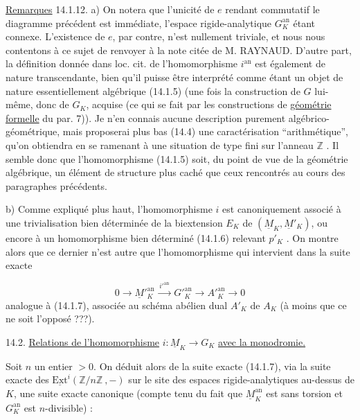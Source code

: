 
\underline{Remarques} 14.1.12. a) On notera que l'unicité de $e$ rendant commutatif le diagramme précédent est immédiate, l'espace rigide-analytique $G_K^{\mathrm{an}}$ étant connexe. L'existence de $e$, par contre, n'est nullement triviale, et nous nous contentons à ce sujet de renvoyer à la note citée de M. RAYNAUD. D'autre part, la définition donnée dans loc. cit. de l'homomorphisme $i^{\mathrm{an}}$ est également de nature transcendante, bien qu'il puisse être interprété comme étant un objet de nature essentiellement algébrique (14.1.5) (une fois la construction de $G$ lui-même, donc de $G_K$, acquise (ce qui se fait par les constructions de \underline{géométrie formelle} du par. 7)). Je n'en connais aucune description purement algébrico-géométrique, mais proposerai plus bas (14.4) une caractérisation ``arithmétique'', qu'on obtiendra en se ramenant à une situation de type fini sur l'anneau $\mathbb{Z}$ . Il semble donc que l'homomorphisme (14.1.5) soit, du point de vue de la géométrie algébrique, un élément de structure plus caché que ceux rencontrés au cours des paragraphes précédents.

b) Comme expliqué plus haut, l'homomorphisme $i$ est canoniquement associé à une trivialisation bien déterminée de la biextension $E_K$ de $(\underline{M}_K,\underline{M}'_K)$, ou encore à un homomorphisme bien déterminé (14.1.6) relevant $p'_K$ . On montre alors que ce dernier n'est autre que l'homomorphisme qui intervient dans la suite exacte

\begin{equation}\tag{14.1.13}
0 \longrightarrow \underline{M}'^{\mathrm{an}}_K \xrightarrow{\;i'^{\mathrm{an}}\;} G'^{\mathrm{an}}_K \longrightarrow A'^{\mathrm{an}}_K \longrightarrow 0
\end{equation}
analogue à (14.1.7), associée au schéma abélien dual $A'_K$ de $A_K$ (à moins que ce ne soit l'opposé ???).




14.2. \underline{Relations de l'homomorphisme} $i:\underline{M}_K \longrightarrow G_K$ \underline{avec la monodromie.}

Soit $n$ un entier $> 0$. On déduit alors de la suite exacte (14.1.7), via la suite exacte des $\underline{\mathrm{Ext}}^i(\mathbb{Z}/n\mathbb{Z}\ , -)$ sur le site des espaces rigide-analytiques au-dessus de $K$, une suite exacte canonique (compte tenu du fait que $\underline{M}_K^{\mathrm{an}}$ est sans torsion et $G_K^{\mathrm{an}}$ est $n$-divisible) :

